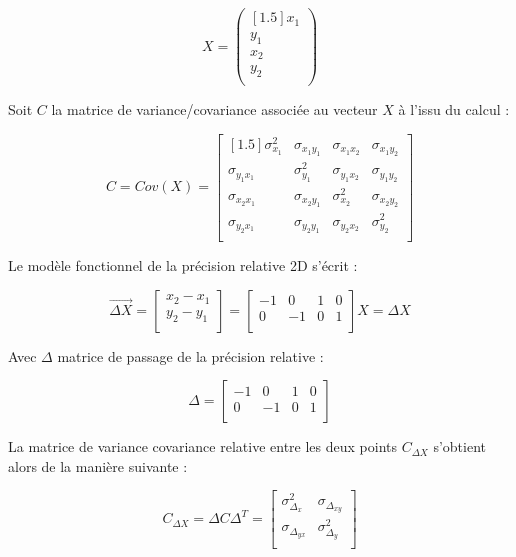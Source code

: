 \documentclass[french]{report}
\begin{document}
$$X=\begin{pmatrix}[1.5] x_1 \\ y_1 \\ x_2 \\ y_2 \\ \end{pmatrix}$$

Soit $C$ la matrice de variance/covariance associée au vecteur $X$ à l'issu du calcul :

$$C=Cov(X)=\begin{bmatrix}[1.5]
\sigma_{x_{1}}^2 & \sigma_{x_{1}y_{1}} & \sigma_{x_{1}x_{2}} & \sigma_{x_{1}y_{2}} \\
\sigma_{y_{1}x_{1}} & \sigma_{y_{1}}^2 & \sigma_{y_{1}x_{2}} & \sigma_{y_{1}y_{2}} \\
\sigma_{x_{2}x_{1}} & \sigma_{x_{2}y_{1}} & \sigma_{x_{2}}^2 & \sigma_{x_{2}y_{2}}  \\
\sigma_{y_{2}x_{1}} & \sigma_{y_{2}y_{1}} & \sigma_{y_{2}x_{2}} & \sigma_{y_{2}}^2  \\ \end{bmatrix}$$


Le modèle fonctionnel de la précision relative 2D s'écrit :

$$\overrightarrow{\Delta X}=
\begin{bmatrix} x_2 - x_1 \\y_2 - y_1\\ \end{bmatrix}=
\begin{bmatrix} -1 & 0 & 1 & 0 \\ 0 & -1 & 0 & 1 \\ \end{bmatrix} X =
\Delta X
$$

Avec $\Delta$ matrice de passage de la précision relative :

$$ \Delta = \begin{bmatrix} -1 & 0 & 1 & 0 \\ 0 & -1 & 0 & 1 \\ \end{bmatrix}$$

La matrice de variance covariance relative entre les deux points $C_{\Delta X}$ s'obtient alors de la manière suivante :

$$C_{\Delta X}=\Delta C \Delta^T=\begin{bmatrix} \sigma_{\Delta_{x}}^2 & \sigma_{\Delta_{x y}} \\ \sigma_{\Delta_{y x}} & \sigma_{\Delta_{y}}^2 \\ \end{bmatrix}$$
\end{document}
